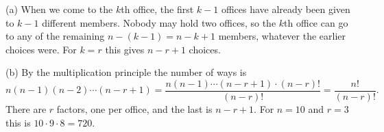 (a) When we come to the $k$th office, the first $k-1$ offices have already been given to $k-1$ different members. Nobody may hold two offices, so the $k$th office can go to any of the remaining $n-(k-1)=n-k+1$ members, whatever the earlier choices were. For $k=r$ this gives $n-r+1$ choices.

(b) By the multiplication principle the number of ways is
\[
n(n-1)(n-2)\cdots(n-r+1)=\dfrac{n(n-1)\cdots(n-r+1)\cdot(n-r)!}{(n-r)!}=\dfrac{n!}{(n-r)!}.
\]
There are $r$ factors, one per office, and the last is $n-r+1$. For $n=10$ and $r=3$ this is $10\cdot9\cdot8=\boxed{720}$.
